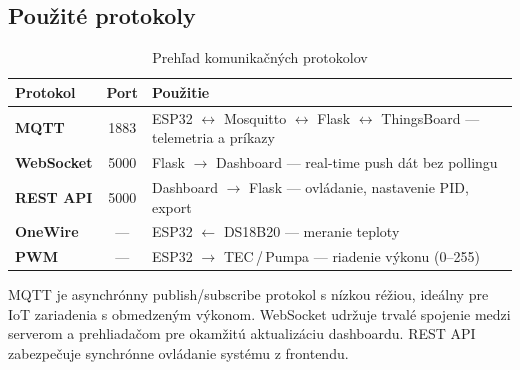 \subsection{Použité protokoly}

\begin{table}[H]
\centering
\renewcommand{\arraystretch}{1.4}
\begin{tabular}{>{\bfseries}l c p{8.5cm}}
\toprule
Protokol & Port & Použitie \\
\midrule
MQTT        & 1883 & ESP32 $\leftrightarrow$ Mosquitto $\leftrightarrow$ Flask $\leftrightarrow$ ThingsBoard --- telemetria a príkazy \\
WebSocket   & 5000 & Flask $\rightarrow$ Dashboard --- real-time push dát bez pollingu \\
REST API    & 5000 & Dashboard $\rightarrow$ Flask --- ovládanie, nastavenie PID, export \\
OneWire     & ---  & ESP32 $\leftarrow$ DS18B20 --- meranie teploty \\
PWM         & ---  & ESP32 $\rightarrow$ TEC\,/\,Pumpa --- riadenie výkonu (0--255) \\
\bottomrule
\end{tabular}
\caption{Prehľad komunikačných protokolov}
\end{table}

MQTT je asynchrónny publish/subscribe protokol s nízkou réžiou, ideálny pre IoT zariadenia s obmedzeným výkonom. WebSocket udržuje trvalé spojenie medzi serverom a prehliadačom pre okamžitú aktualizáciu dashboardu. REST API zabezpečuje synchrónne ovládanie systému z frontendu.